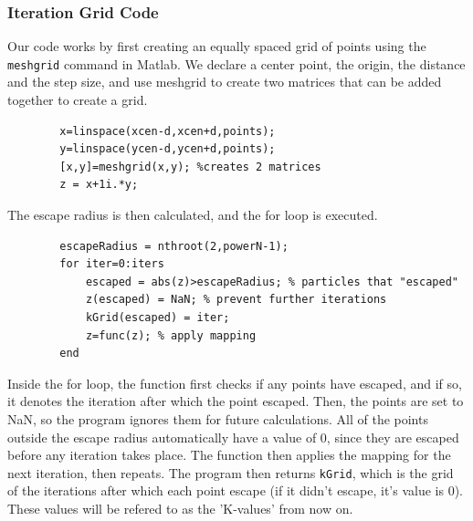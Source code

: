 \documentclass[12pt]{article}
\begin{document}
\begin{onehalfspace}
\subsubsection*{Iteration Grid Code}
	Our code works by first creating an equally spaced grid of points using the \verb|meshgrid| command in Matlab. We declare a center point, the origin, the distance and the step size, and use meshgrid to create two matrices that can be added together to create a grid.
	\begin{lstlisting}
		x=linspace(xcen-d,xcen+d,points);
		y=linspace(ycen-d,ycen+d,points);
		[x,y]=meshgrid(x,y); %creates 2 matrices
		z = x+1i.*y;
	\end{lstlisting}
	The escape radius is then calculated, and the for loop is executed.
	\begin{lstlisting}
		escapeRadius = nthroot(2,powerN-1);
		for iter=0:iters
			escaped = abs(z)>escapeRadius; % particles that "escaped"
			z(escaped) = NaN; % prevent further iterations
			kGrid(escaped) = iter;    
			z=func(z); % apply mapping
		end
	\end{lstlisting}
	Inside the for loop, the function first checks if any points have escaped, and if so, it denotes the iteration after which the point escaped. Then, the points are set to NaN, so the program ignores them for future calculations. All of the points outside the escape radius automatically have a value of 0, since they are escaped before any iteration takes place. The function then applies the mapping for the next iteration, then repeats. The program then returns \verb|kGrid|, which is the grid of the iterations after which each point escape (if it didn't escape, it's value is 0). These values will be refered to as the 'K-values' from now on.

\end{onehalfspace}
\end{document}
